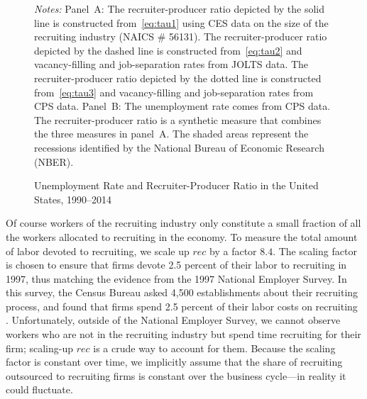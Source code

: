 \documentclass[letterpaper,12pt,leqno]{article}
\def\path{../}
\newcommand{\fignotes}[1]{\centering\parbox[c]{\textwidth}{\footnotesize \textit{Notes:} #1}}
\begin{document}
\begin{figure}[t] \centering
{}
\quad
\caption{Unemployment Rate and Recruiter-Producer Ratio in the United States, 1990--2014}
\fignotes{Panel~A: The recruiter-producer ratio depicted by the solid line is constructed from~\eqref{eq:tau1} using CES data on the size of the recruiting industry (NAICS \# 56131). The recruiter-producer ratio depicted by the dashed line is constructed from~\eqref{eq:tau2} and vacancy-filling and job-separation rates from JOLTS data. The recruiter-producer ratio depicted by the dotted line is constructed from~\eqref{eq:tau3} and vacancy-filling and job-separation rates from CPS data. Panel~B: The unemployment rate comes from CPS data. The recruiter-producer ratio is a synthetic measure that combines the three measures in panel~A. The shaded areas represent the recessions identified by the National Bureau of Economic Research (NBER).} 
\label{fig:tau}\end{figure}

Of course workers of the recruiting industry only constitute a small fraction of all the workers allocated to recruiting in the economy. To measure the total amount of labor devoted to recruiting, we scale up $rec$ by a factor $8.4$. The scaling factor is chosen to ensure that firms devote 2.5 percent of their labor to recruiting in 1997, thus matching the evidence from the 1997 National Employer Survey. In this survey, the Census Bureau asked 4,500 establishments about their recruiting process, and found that firms spend 2.5 percent of their labor costs on recruiting \citep{V10}. Unfortunately, outside of the National Employer Survey, we cannot observe workers who are not in the recruiting industry but spend time recruiting for their firm; scaling-up $rec$ is a crude way to account for them. Because the scaling factor is constant over time, we implicitly assume that the share of recruiting outsourced to recruiting firms is constant over the business cycle---in reality it could fluctuate. 
\end{document}
